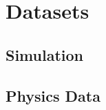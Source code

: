 \chapter{Datasets}\label{sec:objectsDatasets}

\section{Simulation}

\section{Physics Data}\label{sec:physData}


